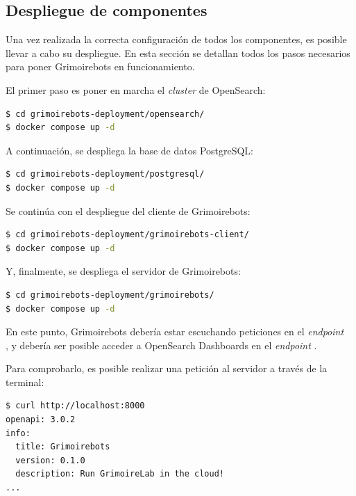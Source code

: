 \subsection{Despliegue de componentes}

Una vez realizada la correcta configuración de todos los componentes, es posible llevar a cabo su despliegue. En esta sección se detallan todos los pasos necesarios para poner Grimoirebots en funcionamiento.

El primer paso es poner en marcha el \emph{cluster} de OpenSearch\index{}:

\begin{lstlisting}[language=bash]
$ cd grimoirebots-deployment/opensearch/
$ docker compose up -d
\end{lstlisting}

A continuación, se despliega la base de datos PostgreSQL\index{}:

\begin{lstlisting}[language=bash]
$ cd grimoirebots-deployment/postgresql/
$ docker compose up -d
\end{lstlisting}

Se continúa con el despliegue del cliente de Grimoirebots:

\begin{lstlisting}[language=bash]
$ cd grimoirebots-deployment/grimoirebots-client/
$ docker compose up -d
\end{lstlisting}

Y, finalmente, se despliega el servidor de Grimoirebots:

\begin{lstlisting}[language=bash]
$ cd grimoirebots-deployment/grimoirebots/
$ docker compose up -d
\end{lstlisting}

En este punto, Grimoirebots debería estar escuchando peticiones en el \emph{endpoint}\\, y debería ser posible acceder a OpenSearch Dashboards en el \emph{endpoint} .

Para comprobarlo, es posible realizar una petición al servidor a través de la terminal:

\begin{lstlisting}[language=bash]
$ curl http://localhost:8000
openapi: 3.0.2
info:
  title: Grimoirebots
  version: 0.1.0
  description: Run GrimoireLab in the cloud!
...
\end{lstlisting}

